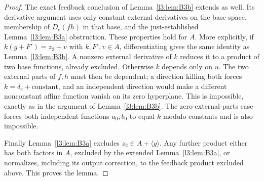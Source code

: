 \documentclass[11pt,a4paper]{article}
\theoremstyle{plain}
\theoremstyle{remark}
\begin{document}
\begin{proof}
The exact feedback conclusion of Lemma~\ref{l3:lem:B3b} extends as well. Its derivative argument uses only constant external derivatives on the base space, membership of $D_e(fh)$ in that base, and the just-established Lemma~\ref{l3:lem:B3a} obstruction. These properties hold for $A$. More explicitly, if $k(g+F')=z_2+v$ with $k,F',v\in A$, differentiating gives the same identity as Lemma~\ref{l3:lem:B3b}. A nonzero external derivative of $k$ reduces it to a product of two base functions, already excluded. Otherwise $k$ depends only on $u$. The two external parts of $f,h$ must then be dependent; a direction killing both forces $k=\delta_e+\text{constant}$, and an independent direction would make a different nonconstant affine function vanish on its zero hyperplane. This is impossible, exactly as in the argument of Lemma~\ref{l3:lem:B3b}. The zero-external-parts case forces both independent functions $a_0,b_0$ to equal $k$ modulo constants and is also impossible.

Finally Lemma~\ref{l3:lem:B3a} excludes $z_2\in A+\langle g\rangle$. Any further product either has both factors in $A$, excluded by the extended Lemma~\ref{l3:lem:B3a}, or normalizes, including its output correction, to the feedback product excluded above. This proves the lemma.
\end{proof}
\end{document}
